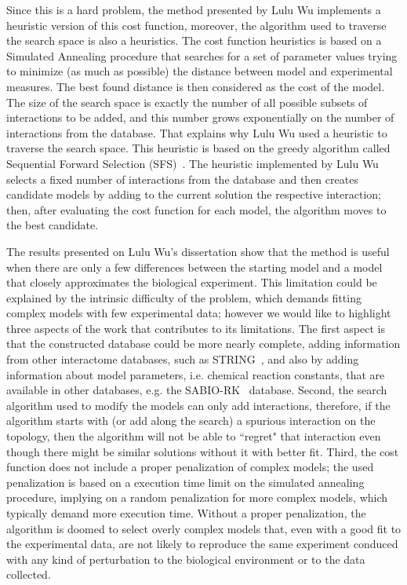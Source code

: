 Since this is a hard problem, the method presented by Lulu Wu 
implements a heuristic version of this cost function, moreover, the 
algorithm used to traverse the search space is also a heuristics. The 
cost function heuristics is based on a Simulated Annealing procedure 
that searches for a set of parameter values trying to minimize (as much 
as possible) the distance between model and experimental measures. The 
best found distance is then considered as the cost of the model. The 
size of the search space is exactly the number of all possible subsets
of interactions to be added, and this number grows exponentially on the 
number of interactions from the database. That explains why Lulu Wu used
a heuristic to traverse the search space. This heuristic is based on the 
greedy algorithm called Sequential Forward Selection 
(SFS)~\cite{Whitney1971}. The heuristic implemented by Lulu Wu selects a
fixed number of interactions from the database and then creates 
candidate models by adding to the current solution the respective 
interaction; then, after evaluating the cost function for each model, 
the algorithm moves to the best candidate.

The results presented on Lulu Wu's dissertation show that the method is 
useful when there are only a few differences between the starting model
and a model that closely approximates the biological experiment. This
limitation could be explained by the intrinsic difficulty of the 
problem, which demands fitting complex models with few experimental 
data; however we would like to highlight three aspects of the work that 
contributes to its limitations. The first aspect is that the constructed 
database could be more nearly complete, adding information from other 
interactome databases, such as STRING~\cite{Szklarczyk2010}, and also by 
adding information about model parameters, i.e. chemical reaction 
constants, that are available in other databases, e.g. the 
SABIO-RK~\cite{Wittig2011} database. Second, the search algorithm used
to modify the models can only add interactions, therefore, if the 
algorithm starts with (or add along the search) a spurious interaction 
on the topology, then the algorithm will not be able to ``regret" that 
interaction even though there might be similar solutions without it with 
better fit. Third, the cost function does not include a proper 
penalization of complex models; the used penalization is based on a 
execution time limit on the simulated annealing procedure, implying on a 
random penalization for more complex models, which typically demand more 
execution time. Without a proper penalization, the algorithm is doomed 
to select overly complex models that, even with a good fit to the 
experimental data, are not likely to reproduce the same experiment
conduced with any kind of perturbation to the biological environment or 
to the data collected.

